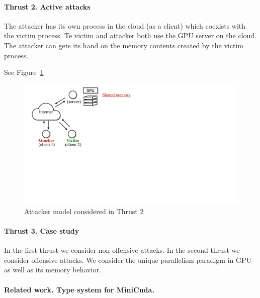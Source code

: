 \paragraph{Thrust 2. Active attacks}
The attacker has its own process in the cloud (as a client) which coexists with the victim process.
%
Te victim and attacker both use the GPU server on the cloud.
%
The attacker can gets its hand on the memory contents created by the victim process.

See Figure~\ref{fig:th2-attack}

\begin{figure}[h]
    \centering
    \includegraphics[clip,trim=0 17cm 10cm 0cm,width=0.72\pdfpagewidth]{figs/thrust2-fig.pdf}
    \caption{Attacker model considered in Thrust 2 }
    \label{fig:th2-attack}
    \end{figure}


\paragraph{Thrust 3. Case study}


In the first thrust we consider non-offensive attacks.
%
In the second thrust we consider offensive attacks.
%
We consider the unique parallelism paradigm in GPU as well as its memory behavior.

\paragraph{Related work. Type system for MiniCuda.}

